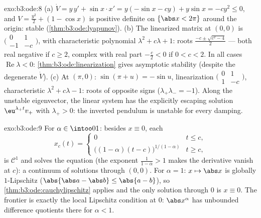 \begin{solution}{exo:b3:ode:8}
(a) $\dot V = y\,y' + \sin x\cdot x' = y(-\sin x - cy) +
y\sin x = -cy^2 \leq 0$, and $V = \frac{y^2}2 + (1 - \cos x)$
is positive definite on $\{\abs x < 2\pi\}$ around the
origin: stable (\cref{thm:b3:ode:lyapunov}).
(b) The linearized matrix at $(0,0)$ is
$\bigl(\begin{smallmatrix}0 & 1\\ -1 &
-c\end{smallmatrix}\bigr)$, with characteristic polynomial
$\lambda^2 + c\lambda + 1$: roots $\frac{-c \pm \sqrt{c^2 -
4}}2$ --- both real negative if $c \geq 2$, complex with real
part $-\frac c2 < 0$ if $0 < c < 2$. In all cases
$\operatorname{Re}\lambda < 0$:
\cref{thm:b3:ode:linearization} gives asymptotic stability
(despite the degenerate $\dot V$).
(c) At $(\pi, 0)$: $\sin(\pi + u) = -\sin u$, linearization
$\bigl(\begin{smallmatrix}0&1\\1&-c\end{smallmatrix}\bigr)$,
characteristic $\lambda^2 + c\lambda - 1$: roots of opposite
signs ($\lambda_+\lambda_- = -1$). Along the unstable
eigenvector, the linear system has the explicitly escaping
solution $\eu^{\lambda_+t}v_+$ with $\lambda_+ > 0$: the
inverted pendulum is unstable for every damping.
\end{solution}

\begin{solution}{exo:b3:ode:9}
For $\alpha \in \intoo01$: besides $x \equiv 0$, each
\[
x_c(t) = \begin{cases}0 & t \leq c,\\
\bigl((1-\alpha)(t - c)\bigr)^{1/(1-\alpha)} & t \geq c,
\end{cases}
\]
is $\mathcal C^1$ and solves the equation (the exponent
$\frac1{1-\alpha} > 1$ makes the derivative vanish at $c$): a
continuum of solutions through $(0,0)$. For $\alpha = 1$: $x
\mapsto \abs x$ is globally $1$-Lipschitz
($\abs{\abs a - \abs b} \leq \abs{a - b}$), so
\cref{thm:b3:ode:cauchylipschitz} applies and the only
solution through $0$ is $x \equiv 0$. The frontier is exactly
the local Lipschitz condition at $0$: $\abs x^\alpha$ has
unbounded difference quotients there for $\alpha < 1$.
\end{solution}

